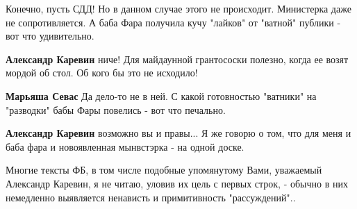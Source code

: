 \begin{itemize}
\begin{itemize}
 
Конечно, пусть СДД! Но в данном случае этого не происходит. Министерка даже не сопротивляется. А баба Фара получила кучу "лайков" от "ватной" публики - вот что удивительно.

 
\textbf{Александр Каревин} ниче! Для майдаунной грантососки полезно, когда ее возят мордой об стол. Об кого бы это не исходило!

 
\textbf{Марьяша Севас} Да дело-то не в ней. С какой готовностью "ватники" на "разводки" бабы Фары повелись - вот что печально.

 
\textbf{Александр Каревин} возможно вы и правы... Я же говорю о том, что для меня и баба фара и новоявленная мынвстэрка - на одной доске.
\end{itemize}

 

Многие тексты ФБ, в том числе подобные упомянутому Вами, уважаемый Александр
Каревин, я не читаю, уловив их цель с первых строк, - обычно в них немедленно
выявляется ненависть и примитивность "рассуждений"..
\end{itemize}

